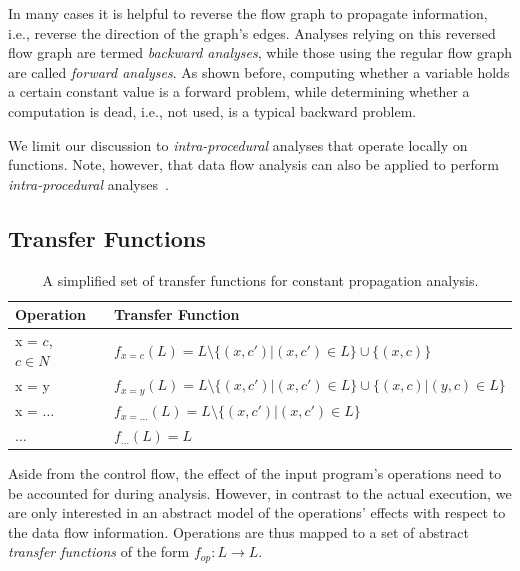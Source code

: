 In many cases it is helpful to reverse the flow graph to propagate information,
i.e., reverse the direction of the graph's edges. Analyses relying on this
reversed flow graph are termed \emph{backward analyses}, while those using the
regular flow graph are called \emph{forward analyses}. As shown before,
computing whether a variable holds a certain constant value is a forward
problem, while determining whether a computation is dead, i.e., not used, is a
typical backward problem.

We limit our discussion to \emph{intra-procedural} analyses that operate locally
on functions. Note, however, that data flow analysis can also be applied to
perform \emph{intra-procedural} analyses~\cite{novillo:bib:NNH99}.

\subsection{Transfer Functions}

\begin{table}[t]
  \begin{center}
    \begin{tabular}{lp{8mm}l}
      Operation          & & Transfer Function                      \\ \hline
      x = $c$, $c \in N$ & & $f_{x=c}(L) = L \setminus \{ (x, c') | (x, c') \in L \} \cup \{ (x, c) \}$ \\
      x = y              & & $f_{x=y}(L) = L \setminus \{ (x, c') | (x, c') \in L \} \cup \{ (x, c) | (y,c) \in L\}$ \\
      x = $\ldots$       & & $f_{x=\ldots}(L) = L \setminus \{ (x, c') | (x, c') \in L \}$ \\
      $\ldots$            & & $f_{\ldots}(L) = L$ \\ \hline
    \end{tabular}
  \end{center}
  \caption{A simplified set of transfer functions for constant propagation
           analysis.}
  \label{novillo:fig:transfer_functions}
  \vspace{-2.5em}
\end{table}

Aside from the control flow, the effect of the input program's operations
need to be accounted for during analysis. However, in contrast to the actual
execution, we are only interested in an abstract model of the operations'
effects with respect to the data flow information. Operations are thus mapped to
a set of abstract \emph{transfer functions} of the form $f_{op}: L \rightarrow
L$.

